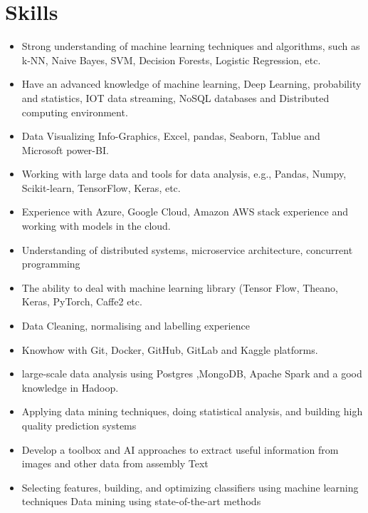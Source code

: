 \documentclass[letterpaper]{twentysecondcv} %
\begin{document}
\section{Skills}
\begin{itemize}
\item Strong understanding of machine learning techniques and algorithms, such as k-NN, Naive Bayes, SVM, Decision Forests, Logistic Regression, etc. 

\item Have an advanced knowledge of machine learning, Deep Learning, probability and statistics, IOT data streaming, NoSQL databases and Distributed computing environment.

\item Data Visualizing Info-Graphics, Excel, pandas, Seaborn, Tablue and Microsoft power-BI.

\item Working with large data and tools for data analysis, e.g., Pandas, Numpy, Scikit-learn, TensorFlow, Keras, etc.

\item Experience with Azure, Google Cloud, Amazon AWS  stack experience and working with models in the cloud.

\item Understanding of distributed systems, microservice architecture, concurrent programming

\item The ability to deal with machine learning library (Tensor Flow, Theano, Keras, PyTorch, Caffe2 etc.

\item Data Cleaning, normalising and labelling experience
 
\item Knowhow with Git, Docker, GitHub, GitLab and Kaggle platforms.

\item large-scale data analysis using  Postgres ,MongoDB, Apache Spark and a good knowledge in Hadoop.

\item Applying data mining techniques, doing statistical analysis, and building high quality prediction systems

\item Develop a toolbox and AI approaches to extract useful information from images and other data from assembly Text

\item Selecting features, building, and optimizing classifiers using machine learning techniques Data mining using state-of-the-art methods


\end{itemize}
\end{document}
